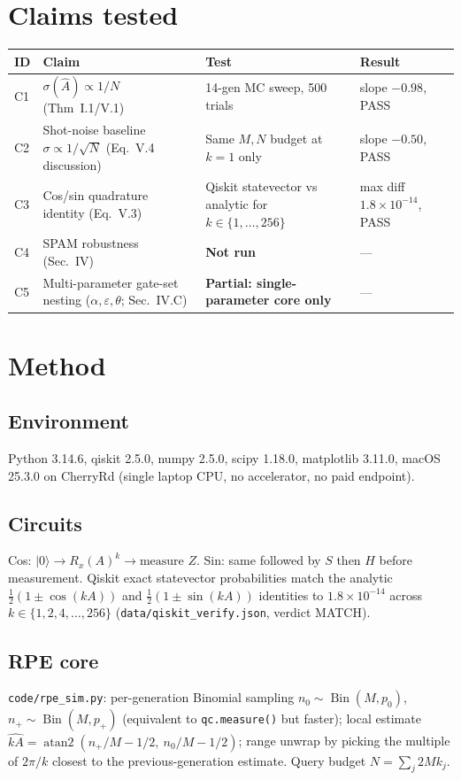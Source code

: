 \documentclass[11pt]{article}
\begin{document}
\section{Claims tested}

\begin{longtable}{p{0.5cm}p{7cm}p{4cm}p{3cm}}
\toprule
ID & Claim & Test & Result \\
\midrule
C1 & $\sigma(\hat A) \propto 1/N$ (Thm~I.1/V.1) & 14-gen MC sweep, 500 trials & slope $-0.98$, PASS \\
C2 & Shot-noise baseline $\sigma \propto 1/\sqrt{N}$ (Eq.~V.4 discussion) & Same $M,N$ budget at $k=1$ only & slope $-0.50$, PASS \\
C3 & Cos/sin quadrature identity (Eq.~V.3) & Qiskit statevector vs analytic for $k\in\{1,\dots,256\}$ & max diff $1.8\times 10^{-14}$, PASS \\
C4 & SPAM robustness (Sec.~IV) & \textbf{Not run} & --- \\
C5 & Multi-parameter gate-set nesting ($\alpha,\varepsilon,\theta$; Sec.~IV.C) & \textbf{Partial: single-parameter core only} & --- \\
\bottomrule
\end{longtable}

\section{Method}

\subsection{Environment}
Python 3.14.6, qiskit 2.5.0, numpy 2.5.0, scipy 1.18.0, matplotlib
3.11.0, macOS 25.3.0 on CherryRd (single laptop CPU, no accelerator, no
paid endpoint).

\subsection{Circuits}
Cos: $|0\rangle \to R_x(A)^k \to \text{measure } Z$. Sin: same followed
by $S$ then $H$ before measurement. Qiskit exact statevector
probabilities match the analytic $\tfrac{1}{2}(1\pm\cos(kA))$ and
$\tfrac{1}{2}(1\pm\sin(kA))$ identities to $1.8\times 10^{-14}$ across
$k \in \{1,2,4,\dots,256\}$
(\texttt{data/qiskit\_verify.json}, verdict MATCH).

\subsection{RPE core}
\texttt{code/rpe\_sim.py}: per-generation Binomial sampling
$n_0 \sim \operatorname{Bin}(M,p_0)$, $n_+ \sim \operatorname{Bin}(M,p_+)$
(equivalent to \texttt{qc.measure()} but faster); local estimate
$\widehat{kA} = \operatorname{atan2}(n_+/M-1/2,\ n_0/M-1/2)$; range unwrap by
picking the multiple of $2\pi/k$ closest to the previous-generation
estimate. Query budget $N = \sum_j 2 M k_j$.
\end{document}

